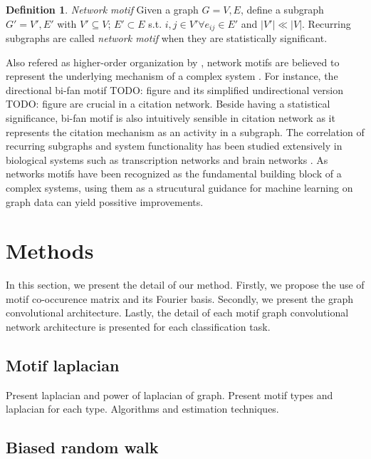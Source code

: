 \documentclass{article}
\theoremstyle{definition}
\newtheorem{definition}{Definition}[section]
\begin{document}
\begin{definition}{\emph{Network motif}}
Given a graph $G = {V,E}$, define a subgraph $G' = {V', E'}$ with $V' \subseteq V$;
$E' \subset E$ s.t. $i,j \in V' \forall e_{ij} \in E'$ and $|V'| \ll |V|$. Recurring subgraphs
are called \emph{network motif} when they are statistically significant.
\end{definition}

Also refered as higher-order organization by \citeauthor{juremotif}, network motifs
are believed to represent the underlying mechanism of a complex system \cite{netmotif,alon2006introduction,mangan2003structure}. 
For instance, the directional bi-fan motif TODO: figure
and its simplified undirectional version TODO: figure are crucial in a citation network. 
Beside having a statistical significance, bi-fan motif is also intuitively 
sensible in citation network as it represents the citation mechanism as an activity
in a subgraph. The correlation of recurring subgraphs and system functionality has 
been studied extensively in biological systems such as 
transcription networks \cite{mangan2003structure} and brain 
networks \cite{brainnetheuvel,honey2007network}. As networks motifs
have been recognized as the fundamental building block of a complex
systems, using them as a strucutural guidance for machine learning
on graph data can yield possitive improvements.

\section{Methods}

In this section, we present the detail of our method. Firstly,
we propose the use of motif co-occurence matrix and its Fourier basis.
Secondly, we present the graph convolutional architecture. Lastly, the
detail of each motif graph convolutional network architecture is
presented for each classification task.

\subsection{Motif laplacian}

Present laplacian and power of laplacian of graph.
Present motif types and laplacian for each type.
Algorithms and estimation techniques.

\subsection{Biased random walk}
\end{document}
